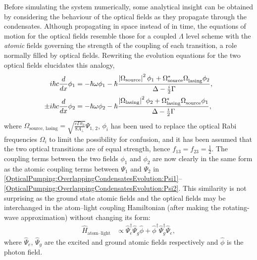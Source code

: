 Before simulating the system numerically, some analytical insight can be obtained by considering the behaviour of the optical fields as they propagate through the condensates.  Although propagating in space instead of in time, the equations of motion for the optical fields resemble those for a coupled $\Lambda$ level scheme with the \emph{atomic} fields governing the strength of the coupling of each transition, a role normally filled by optical fields.  Rewriting the evolution equations for the two optical fields elucidates this analogy,
\begin{subequations}
    \label{OpticalPumping:OpticalPropagationAnalogy}
    \begin{align}
        i \hbar c \frac{d}{dx} \phi_1 &= -\hbar \omega \phi_1  - \hbar \frac{\abs{\Omega_\text{source}}^2 \phi_1 + \Omega_\text{source}^* \Omega_\text{lasing}^{\phantom{*}} \phi_2}{\Delta - \frac{i}{2} \Gamma},\\
        \pm i \hbar c\frac{d}{dx} \phi_2 &= - \hbar \omega \phi_2 - \hbar \frac{\abs{\Omega_\text{lasing}}^2 \phi_2 + \Omega_\text{lasing}^* \Omega_\text{source}^{\phantom{*}} \phi_1}{\Delta - \frac{i}{2} \Gamma},
    \end{align}
\end{subequations}
where $\displaystyle\Omega_\text{source, lasing} = \sqrt{\frac{c \Gamma \sigma_0}{8 A_\perp}} \Psi_{1,\, 2}$, $\phi_i$ has been used to replace the optical Rabi frequencies $\Omega_i$ to limit the possibility for confusion, and it has been assumed that the two optical transitions are of equal strength, hence $f_{13} = f_{23} = \frac{1}{2}$.  The coupling terms between the two fields $\phi_1$ and $\phi_2$ are now clearly in the same form as the atomic coupling terms between $\Psi_1$ and $\Psi_2$ in \eqref{OpticalPumping:OverlappingCondensatesEvolution:Psi1}--\eqref{OpticalPumping:OverlappingCondensatesEvolution:Psi2}.  This similarity is not surprising as the ground state atomic fields and the optical fields may be interchanged in the atom--light coupling Hamiltonian (after making the rotating-wave approximation) without changing its form:
\begin{align}
    \hat{H}_\text{atom--light} &\propto \hat{\Psi}_e^\dagger \hat{\Psi}_g^{\phantom{\dagger}} \hat{\phi} + \hat{\phi}^\dagger \hat{\Psi}_g^\dagger \hat{\Psi}_e^{\phantom{\dagger}},
\end{align}
where $\hat{\Psi}_e$, $\hat{\Psi}_g$ are the excited and ground atomic fields respectively and $\hat{\phi}$ is the photon field.

